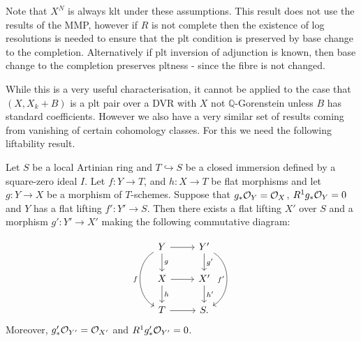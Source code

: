 Note that $X^{N}$ is always klt under these assumptions. This result does not use the results of the MMP, however if $R$ is not complete then the existence of log resolutions is needed to ensure that the plt condition is preserved by base change to the completion. Alternatively if plt inversion of adjunction is known, then base change to the completion preserves pltness - since the fibre is not changed. 

While this is a very useful characterisation, it cannot be applied to the case that $(X,X_{k}+B)$ is a plt pair over a DVR with $X$ not $\mathbb{Q}$-Gorenstein unless $B$ has standard coefficients. However we also have a very similar set of results coming from vanishing of certain cohomology classes. For this we need the following liftability result.

\begin{proposition}\label{push-lift}
	Let $S$ be a local Artinian ring and $T \hookrightarrow S$ be a closed immersion defined by a square-zero ideal $I$.  Let $f\colon Y \to T$, and $h\colon X \to T$ be flat morphisms and let $g\colon Y \to X$ be a morphism of $T$-schemes. 
	Suppose that $g_{*} \ox[Y]=\ox$, $R^{1}g_{*} \ox[Y] = 0$ and $Y$ has a flat lifting $f' \colon Y' \to S$. Then there exists a flat lifting $X'$ over $S$ and a morphism $g' \colon Y' \to X'$ making the following commutative diagram:
	
	\[\begin{tikzcd}
	Y \arrow[r] \arrow[d, "g"]  \arrow[bend right=60,swap, "f"]{dd}
	& Y' \arrow[d, "g'"] \arrow[bend left=60,swap, "f'"]{dd} \\
	X \arrow[d, "h"] \arrow[r] & X' \arrow[d, "h'"] \\
	T \arrow[r]                        & S    .                     
	\end{tikzcd}\]	
	Moreover,  $g'_{*} \ox[Y']=\ox[X']$ and $R^{1}g'_{*} \ox[Y'] = 0$.
\end{proposition}

